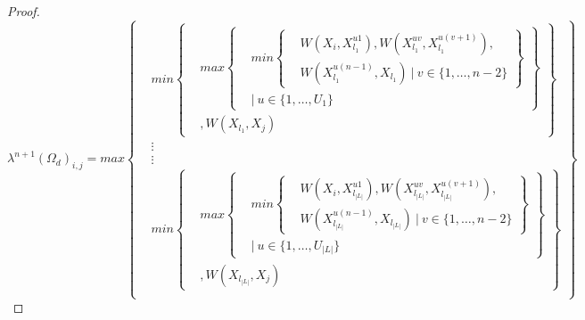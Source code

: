 \documentclass{article} %
\begin{document}
\begin{proof}
\[
\lambda^{n+1}(\Omega_d)_{i,j} =max
\left\{
  \begin{aligned}
    &min
      \left\{
      \begin{aligned}
        &max
          \left\{
          \begin{aligned}
            &min\left\{
            \begin{aligned}
            &W(X_i,X_{l_1}^{u1}), W(X_{l_1}^{uv},X_{l_1}^{u(v+1)}), \\
            &W(X_{l_1}^{u(n-1)},X_{l_1})\ |\ v\in\{1,\ldots,n-2\}
            \end{aligned}
            \right\} \\
            &|\ u\in\{1,\ldots,U_1\}
          \end{aligned}
          \right\} \\
          &, W(X_{l_1},X_j)
      \end{aligned}
      \right\} \\
      &\vdots \\
      &\vdots \\
    &min
      \left\{
      \begin{aligned}
        &max
          \left\{
          \begin{aligned}
            &min\left\{
            \begin{aligned}
            &W(X_i,X_{l_{|L|}}^{u1}), W(X_{l_{|L|}}^{uv},X_{l_{|L|}}^{u(v+1)}), \\
            &W(X_{l_{|L|}}^{u(n-1)},X_{l_{|L|}})\ |\ v\in\{1,\ldots,n-2\}
            \end{aligned}
            \right\} \\
            &|\ u\in\{1,\ldots,U_{|L|}\}
          \end{aligned}
          \right\} \\
          &, W(X_{l_{|L|}},X_j)
      \end{aligned}
      \right\} \\
  \end{aligned}
\right\}
\]


\end{proof}
\end{document}
